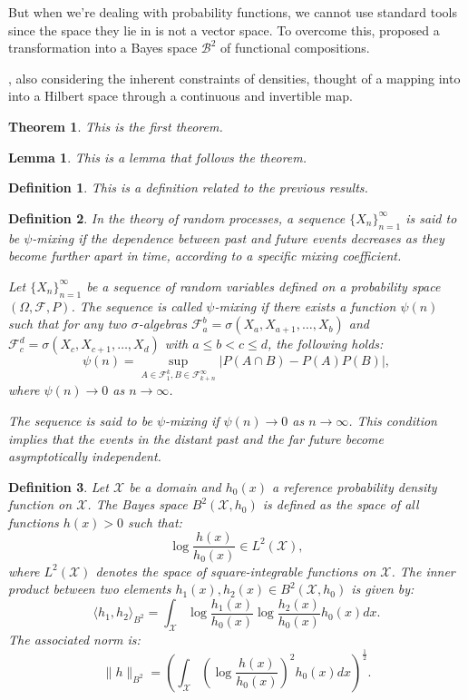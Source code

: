 \documentclass[
	12pt,				%
	oneside,			%
	a4paper,			%
	english,			%
	brazil				%
	]{abntex2ppgsi}
\newtheorem{theorem}{Theorem} %
\newtheorem{lemma}{Lemma}     %
\newtheorem{definition}{Definition}
\begin{document}
But when we're dealing with probability functions, we cannot use standard tools since the space they lie in is not a vector space. To overcome this,  proposed a transformation into a Bayes space $\mathcal{B}^2$ of functional compositions.

, also considering the inherent constraints of densities, thought of a mapping into into a Hilbert space through a continuous and invertible map.

\begin{theorem}
This is the first theorem.
\end{theorem}

\begin{lemma}
This is a lemma that follows the theorem.
\end{lemma}

\begin{definition}
This is a definition related to the previous results.
\end{definition}

\begin{definition}
In the theory of random processes, a sequence $\{ X_n \}_{n=1}^{\infty}$ is said to be $\psi$-mixing if the dependence between past and future events decreases as they become further apart in time, according to a specific mixing coefficient.

Let $\{ X_n \}_{n=1}^{\infty}$ be a sequence of random variables defined on a probability space $(\Omega, \mathcal{F}, P)$. The sequence is called \emph{$\psi$-mixing} if there exists a function $\psi(n)$ such that for any two $\sigma$-algebras $\mathcal{F}_a^b = \sigma(X_a, X_{a+1}, \ldots, X_b)$ and $\mathcal{F}_c^d = \sigma(X_c, X_{c+1}, \ldots, X_d)$ with $a \leq b < c \leq d$, the following holds:
\[
\psi(n) = \sup_{A \in \mathcal{F}_1^k, B \in \mathcal{F}_{k+n}^\infty} |P(A \cap B) - P(A)P(B)|,
\]
where $\psi(n) \to 0$ as $n \to \infty$.

The sequence is said to be $\psi$-mixing if $\psi(n) \to 0$ as $n \to \infty$. This condition implies that the events in the distant past and the far future become asymptotically independent.
\end{definition}

\begin{definition}

Let $\mathcal{X}$ be a domain and $h_0(x)$ a reference probability density function on $\mathcal{X}$. The \emph{Bayes space} $B^2(\mathcal{X}, h_0)$ is defined as the space of all functions $h(x) > 0$ such that:
\[
\log \frac{h(x)}{h_0(x)} \in L^2(\mathcal{X}),
\]
where $L^2(\mathcal{X})$ denotes the space of square-integrable functions on $\mathcal{X}$. The inner product between two elements $h_1(x), h_2(x) \in B^2(\mathcal{X}, h_0)$ is given by:
\[
\langle h_1, h_2 \rangle_{B^2} = \int_{\mathcal{X}} \log \frac{h_1(x)}{h_0(x)} \log \frac{h_2(x)}{h_0(x)} h_0(x) dx.
\]
The associated norm is:
\[
\| h \|_{B^2} = \left( \int_{\mathcal{X}} \left( \log \frac{h(x)}{h_0(x)} \right)^2 h_0(x) dx \right)^{\frac{1}{2}}.
\]
\end{definition}
\end{document}
